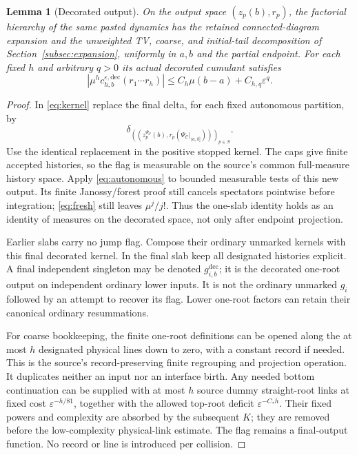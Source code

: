 \documentclass[11pt]{article}
\newcommand{\eps}{\varepsilon}
\newtheorem{lemma}[theorem]{Lemma}
\theoremstyle{definition}\newtheorem{definition}[theorem]{Definition}
\theoremstyle{remark}\newtheorem{remark}[theorem]{Remark}
\numberwithin{equation}{section}
\begin{document}
\begin{lemma}[Decorated output]\label{lem:decorated}
On the output space $(z_p(b),r_p)$, the factorial hierarchy of the same
pasted dynamics has the retained connected-diagram expansion and the
unweighted TV, coarse, and initial-tail decomposition of
Section~\ref{subsec:expansion}, uniformly in $a,b$ and the partial endpoint.
For each fixed $h$ and arbitrary $q>0$ its actual decorated cumulant satisfies
\begin{equation}\label{eq:flag-cumulant}
 \left|\mu^h c_{h,b}^{\eps,\mathrm{dec}}(r_1\cdots r_h)\right|
       \le C_h\mu(b-a)+C_{h,q}\eps^q.
\end{equation}
\end{lemma}
\begin{proof}
In \eqref{eq:kernel} replace the final delta, for each fixed autonomous
partition, by
\begin{equation}\label{eq:decorated-delta}
 \delta_{((z_p^{\Psi_{\mathcal C}}(b),
                   r_p(\Psi_{\mathcal C}|_{(a,b]})))_{p\in S}}.
\end{equation}
Use the identical replacement in the positive stopped kernel. The caps give
finite accepted histories, so the flag is measurable on the source's common
full-measure history space. Apply \eqref{eq:autonomous} to bounded measurable
tests of this new output. Its finite Janossy/forest proof still cancels
spectators pointwise before integration; \eqref{eq:fresh} still leaves
$\mu^j/j!$. Thus the one-slab identity holds as an identity of measures
on the decorated space, not only after endpoint projection.

Earlier slabs carry no jump flag. Compose their ordinary unmarked kernels
with this final decorated kernel. In the final slab keep all designated
histories explicit. A final independent singleton may be denoted
$g_{i,b}^{\mathrm{dec}}$; it is the decorated one-root output on independent
ordinary lower inputs. It is not the ordinary unmarked $g_i$ followed by an
attempt to recover its flag. Lower one-root factors can retain their
canonical ordinary resummations.

For coarse bookkeeping, the finite one-root definitions can be opened along
the at most $h$ designated physical lines down to zero, with a constant
record if needed. This is the source's record-preserving finite regrouping
and projection operation. It duplicates neither an input nor an interface
birth. Any needed bottom continuation can be supplied with at most $h$
source dummy straight-root links at fixed cost $\eps^{-h/81}$, together
with the allowed top-root deficit $\eps^{-C_*h}$. Their fixed powers and
complexity are absorbed by the subsequent $K$; they are removed before the
low-complexity physical-link estimate. The flag remains a final-output
function. No record or line is introduced per collision.


\end{proof}
\end{document}
